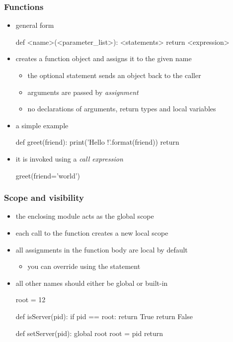 %
%


\begin{frame}[fragile]
%
  \frametitle{Functions}
%
  \begin{itemize}
%
  \item general form
    \begin{ipython}{}
      def <name>(<parameter_list>):
          <statements>
          return <expression>
    \end{ipython}
%
  \item creates a function object and assigns it to the given name
    \begin{itemize}
    \item the optional  statement sends an object back to the caller
    \item arguments are passed by \emph{assignment}
    \item no declarations of arguments, return types and local variables
    \end{itemize}
%
  \item a simple example
    \begin{ipython}{}
      def greet(friend):
          print('Hello {}!'.format(friend))
          return
    \end{ipython}
%
  \item it is invoked using a \emph{call expression}
    \begin{ipython}{}
      greet(friend='world')
    \end{ipython}
%
  \end{itemize}
%
\end{frame}

\begin{frame}[fragile]
%
  \frametitle{Scope and visibility}
%
  \begin{itemize}
%
  \item the enclosing module acts as the global scope
  \item each call to the function creates a new local scope
  \item all assignments in the function body are local by default
    \begin{itemize}
    \item you can override using the  statement
    \end{itemize}
  \item all other names should either be global or built-in
%
    \begin{ipython}{}
      root = 12

      def isServer(pid):
          if pid == root: return True
          return False

      def setServer(pid):
          global root
          root = pid
          return
    \end{ipython}
  \end{itemize}
%
\end{frame}

